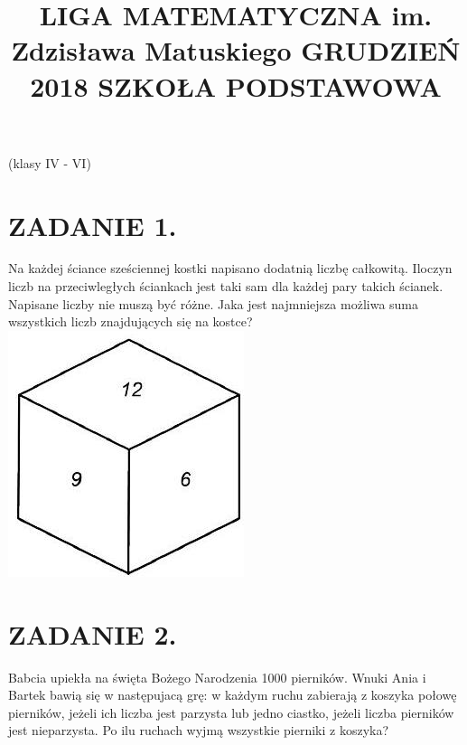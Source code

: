 \documentclass[10pt]{article}
\title{LIGA MATEMATYCZNA im. Zdzisława Matuskiego GRUDZIEŃ 2018 SZKOŁA PODSTAWOWA }
\author{}
\date{}
\begin{document}
\maketitle
(klasy IV - VI)

\section*{ZADANIE 1.}
Na każdej ściance sześciennej kostki napisano dodatnią liczbę całkowitą. Iloczyn liczb na przeciwległych ściankach jest taki sam dla każdej pary takich ścianek. Napisane liczby nie muszą być różne. Jaka jest najmniejsza możliwa suma wszystkich liczb znajdujących się na kostce?\\
\includegraphics[max width=\textwidth, center]{2024_11_21_a81a4da0f1de819f5471g-1}

\section*{ZADANIE 2.}
Babcia upiekła na święta Bożego Narodzenia 1000 pierników. Wnuki Ania i Bartek bawią się w następujacą grę: w każdym ruchu zabierają z koszyka połowę pierników, jeżeli ich liczba jest parzysta lub jedno ciastko, jeżeli liczba pierników jest nieparzysta. Po ilu ruchach wyjmą wszystkie pierniki z koszyka?
\end{document}
